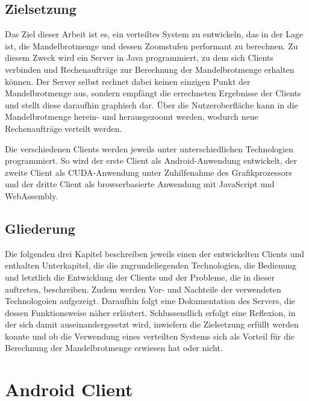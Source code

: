 \documentclass[12pt, onecolumn, notitlepage]{scrartcl}
\begin{document}
\subsection{Zielsetzung}
Das Ziel dieser Arbeit ist es, ein verteiltes System zu entwickeln, das in der Lage ist, die Mandelbrotmenge und dessen Zoomstufen performant zu berechnen. Zu diesem Zweck wird ein Server in Java programmiert, zu dem sich Clients verbinden und Rechenaufträge zur Berechnung der Mandelbrotmenge erhalten können. Der Server selbst rechnet dabei keinen einzigen Punkt der Mandelbrotmenge aus, sondern empfängt die errechneten Ergebnisse der Clients und stellt diese daraufhin graphisch dar. Über die Nutzeroberfläche kann in die Mandelbrotmenge herein- und herausgezoomt werden, wodurch neue Rechenaufträge verteilt werden. \par
Die verschiedenen Clients werden jeweils unter unterschiedlichen Technologien programmiert. So wird der erste Client als Android-Anwendung entwickelt, der zweite Client als CUDA-Anwendung unter Zuhilfenahme des Grafikprozessors und der dritte Client als browserbasierte Anwendung mit JavaScript und WebAssembly. 
\subsection{Gliederung}
Die folgenden drei Kapitel beschreiben jeweils einen der entwickelten Clients und enthalten Unterkapitel, die die zugrundeliegenden Technologien, die Bedienung und letztlich die Entwicklung der Clients und der Probleme, die in dieser auftreten, beschreiben. Zudem werden Vor- und Nachteile der verwendeten Technologoien aufgezeigt.
Daraufhin folgt eine Dokumentation des Servers, die dessen Funktionsweise näher erläutert. Schlussendlich erfolgt eine Reflexion, in der sich damit auseinandergesetzt wird, inwiefern die Zielsetzung erfüllt werden konnte und ob die Verwendung eines verteilten Systems sich als Vorteil für die Berechnung der Mandelbrotmenge erwiesen hat oder nicht.


\section{Android Client}
\end{document}
